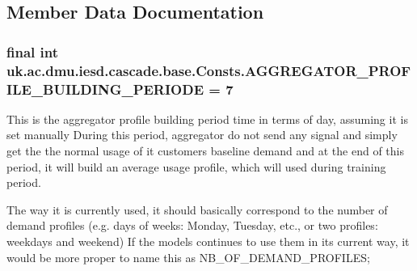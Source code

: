 \subsection{Member Data Documentation}
\hypertarget{classuk_1_1ac_1_1dmu_1_1iesd_1_1cascade_1_1base_1_1_consts_a3d47484df22ee731ef9618cfb2242ea6}{
\subsubsection[{A\-G\-G\-R\-E\-G\-A\-T\-O\-R\-\_\-\-P\-R\-O\-F\-I\-L\-E\-\_\-\-B\-U\-I\-L\-D\-I\-N\-G\-\_\-\-P\-E\-R\-I\-O\-D\-E}]{\setlength{\rightskip}{0pt plus 5cm}final int uk.\-ac.\-dmu.\-iesd.\-cascade.\-base.\-Consts.\-A\-G\-G\-R\-E\-G\-A\-T\-O\-R\-\_\-\-P\-R\-O\-F\-I\-L\-E\-\_\-\-B\-U\-I\-L\-D\-I\-N\-G\-\_\-\-P\-E\-R\-I\-O\-D\-E = 7\hspace{0.3cm}{\ttfamily [static]}}}\label{classuk_1_1ac_1_1dmu_1_1iesd_1_1cascade_1_1base_1_1_consts_a3d47484df22ee731ef9618cfb2242ea6}


This is the aggregator profile building period time in terms of day, assuming it is set manually During this period, aggregator do not send any signal and simply get the the normal usage of it customers baseline demand and at the end of this period, it will build an average usage profile, which will used during training period. 

The way it is currently used, it should basically correspond to the number of demand profiles (e.\-g. days of weeks\-: Monday, Tuesday, etc., or two profiles\-: weekdays and weekend) If the models continues to use them in its current way, it would be more proper to name this as N\-B\-\_\-\-O\-F\-\_\-\-D\-E\-M\-A\-N\-D\-\_\-\-P\-R\-O\-F\-I\-L\-E\-S;

